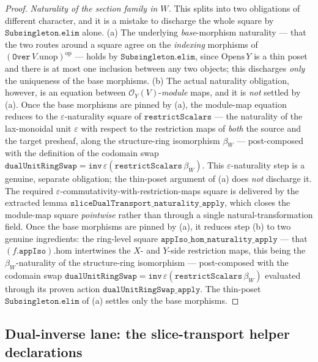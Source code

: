 \begin{proof}
  \emph{Naturality of the section family in \(W\).} This splits into two obligations of
  different character, and it is a mistake to discharge the whole square by
  \(\mathtt{Subsingleton.elim}\) alone. (a) The underlying \emph{base}-morphism naturality ---
  that the two routes around a square agree on the \emph{indexing} morphisms of
  \((\mathtt{Over}\,V.\mathrm{unop})^{\mathrm{op}}\) --- holds by \(\mathtt{Subsingleton.elim}\),
  since \(\mathrm{Opens}\,Y\) is a thin poset and there is at most one inclusion between any
  two objects; this discharges \emph{only} the uniqueness of the base morphisms. (b) The
  actual naturality obligation, however, is an equation between
  \(\mathcal{O}_Y(V)\)-\emph{module} maps, and it is \emph{not} settled by (a). Once the base
  morphisms are pinned by (a), the module-map equation reduces to the \(\varepsilon\)-naturality
  square of \(\mathtt{restrictScalars}\) --- the naturality of the lax-monoidal unit
  \(\varepsilon\) with respect to the restriction maps of \emph{both} the source and the target
  presheaf, along the structure-ring isomorphism \(\beta_W\) --- post-composed with the
  definition of the codomain swap \(\mathtt{dualUnitRingSwap} = \mathtt{inv}\,
  \varepsilon(\mathtt{restrictScalars}\,\beta_W)\). This \(\varepsilon\)-naturality step is a
  genuine, separate obligation; the thin-poset argument of (a) does \emph{not} discharge it.
  The required \(\varepsilon\)-commutativity-with-restriction-maps square is delivered by the
  extracted lemma \(\mathtt{sliceDualTransport\_naturality\_apply}\), which closes the
  module-map square \emph{pointwise} rather than through a single natural-transformation
  field. Once the base morphisms are pinned by (a), it reduces step (b) to two genuine
  ingredients: the ring-level square \(\mathtt{appIso\_hom\_naturality\_apply}\) --- that
  \((f.\mathtt{appIso}).\mathrm{hom}\) intertwines the \(X\)- and \(Y\)-side restriction maps,
  this being the \(\beta_W\)-naturality of the structure-ring isomorphism --- post-composed with
  the codomain swap \(\mathtt{dualUnitRingSwap} = \mathtt{inv}\,\varepsilon(\mathtt{restrictScalars}\,
  \beta_W)\) evaluated through its proven action \(\mathtt{dualUnitRingSwap\_apply}\). The
  thin-poset \(\mathtt{Subsingleton.elim}\) of (a) settles only the base morphisms.
\end{proof}

\subsection{Dual-inverse lane: the slice-transport helper declarations}
\label{mk-subsec:dual_inverse_helpers}

